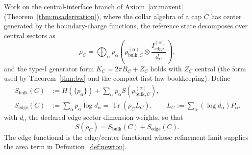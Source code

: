 \documentclass[11pt]{article}
\begin{document}
Work on the central-interface branch of Axiom~\ref{ax:maxent}
(Theorem~\ref{thm:msaderivation}), where the collar algebra of a cap \(C\)
has center generated by the boundary-charge functions, the reference state
decomposes over central sectors as
\[
\rho_C=\bigoplus_\alpha p_\alpha
\left(\rho^{(\alpha)}_{\mathrm{bulk},C}
\otimes\frac{I^{(\alpha)}_{\mathrm{edge}}}{d_\alpha}\right),
\]
and the type-I generator form
\(K_C=2\pi B_C+Z_C\) holds with \(Z_C\) central
(the form used by Theorem~\ref{thm:bw} and the compact first-law
bookkeeping). Define
\[
\begin{aligned}
S_{\mathrm{bulk}}(C)
&:=H(\{p_\alpha\})+\sum_\alpha p_\alpha
S(\rho^{(\alpha)}_{\mathrm{bulk},C}),\\
S_{\mathrm{edge}}(C)
&:=\sum_\alpha p_\alpha\log d_\alpha
=\operatorname{Tr}(\rho_C L_C),
\qquad
L_C:=\sum_\alpha(\log d_\alpha)P_\alpha .
\end{aligned}
\]
with \(d_\alpha\) the declared edge-sector dimension weights, so that
\[
S(\rho_C)=S_{\mathrm{bulk}}(C)+S_{\mathrm{edge}}(C).
\]
The edge functional is the
edge/center functional whose refinement limit supplies the area term in
Definition~\ref{def:newton}.
\end{document}
